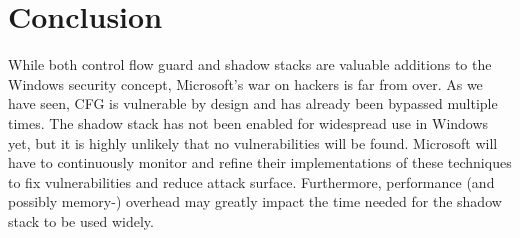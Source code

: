 \documentclass[10pt,twocolumn,a4paper]{article}
\begin{document}
\section{Conclusion}\label{sec:conclusion}

While both control flow guard and shadow stacks are valuable additions to the Windows security concept, Microsoft's war on hackers is far from over. As we have seen, CFG is vulnerable by design and has already been bypassed multiple times. The shadow stack has not been enabled for widespread use in Windows yet, but it is highly unlikely that no vulnerabilities will be found.
Microsoft will have to continuously monitor and refine their implementations of these techniques to fix vulnerabilities and reduce attack surface.
Furthermore, performance (and possibly memory-) overhead may greatly impact the time needed for the shadow stack to be used widely.



\end{document}
